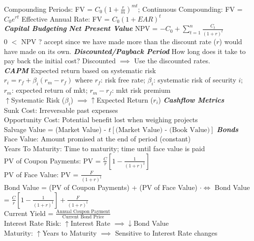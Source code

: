\documentclass{letter}
\newcommand{\textib}[1]{\textit{\textbf{{#1}}}}
\begin{document}
Compounding Periods: FV = $C_0 \left(1 + \frac{r}{m}\right)^{mt}$; 
Continuous Compounding: FV = $C_0 e^{rt}$ 
Effective Annual Rate: FV = $C_0 \left(1 + EAR\right)^{t}$ \\
\newline
\textib{Capital Budgeting}
\textib{Net Present Value}
NPV = $-C_0 + \sum\limits_{t = 1}^{n} \frac{C_t}{(1 + r)^t}$ \\
0 $<$ NPV ? accept since we have made more than the discount rate ($r$) would have made on its own.
\newline
\textib{Discounted/Payback Period}
How long does it take to pay back the initial cost? Discounted $\implies$ Use the discounted rates. \\
\textib{CAPM} Expected return based on systematic risk \\
$r_i = r_f + \beta_{i} \left(r_{m} - r_{f}\right)$ where $r_{f}$: risk free rate; $\beta_{i}$: 
systematic risk of security $i$; $r_{m}$: expected return of mkt; $r_{m} - r_{f}$: mkt risk premium \\
$\uparrow$Systematic Risk ($\beta_{i}$) $\implies \uparrow$Expected Return ($r_{i}$)
\newline
\textib{Cashflow Metrics} \\
Sunk Cost: Irreversable past expenses \\
Opportunity Cost: Potential benefit lost when weighing projects \\
Salvage Value = (Market Value) - $t\left[\text{(Market Value) - (Book Value)}\right]$
\newline
\textib{Bonds}
Face Value: Amount promised at the end of period (constant) \\
Years To Maturity: Time to maturity; time until face value is paid \\
PV of Coupon Payments: PV = $\frac{C}{r} \left[1 - \frac{1}{\left(1 + r\right)^{t}}\right]$ \\
PV of Face Value: PV = $\frac{F}{(1 + r)^{t}}$ \\
Bond Value = (PV of Coupon Payments) + (PV of Face Value) \leaders\hbox{$\cdot$}\hfill $\iff$ 
Bond Value = $\frac{C}{r} \left[1 - \frac{1}{\left(1 + r\right)^{t}}\right] + \frac{F}{(1 + r)^{t}}$ \\
Current Yield = $\frac{\text{Annual Coupon Payment}}{\text{Current Bond Price}}$ \\
Interest Rate Risk: $\uparrow$Interest Rate $\implies \downarrow$Bond Value \\
Maturity: $\uparrow$Years to Maturity $\implies$ Sensitive to Interest Rate changes \\
\end{document}
